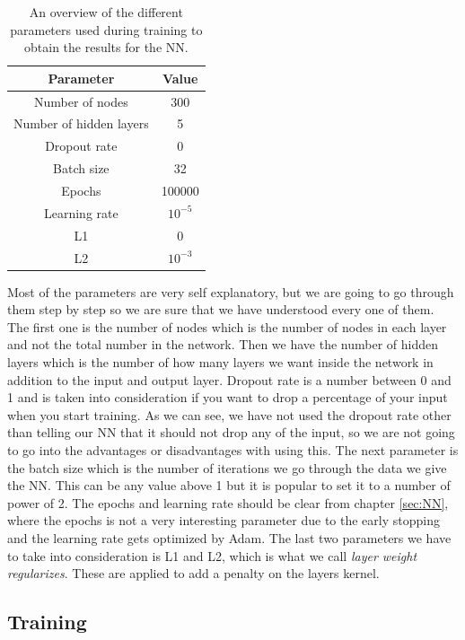 \begin{table}[H]
    \centering
    \renewcommand{\arraystretch}{1.}
    \begin{tabular}{c c}
    \toprule
        \textbf{Parameter} & \textbf{Value}\\
        \midrule
        \midrule
        Number of nodes & 300  \\
        Number of hidden layers & 5\\
        Dropout rate & 0\\
        Batch size & 32\\
        Epochs & 100000\\
        Learning rate & $10^{-5}$\\
        L1 & 0\\
        L2 & $10^{-3}$\\
        \bottomrule
    \end{tabular}
    \caption{An overview of the different parameters used during training to obtain the results for the NN.}
    \label{tab:parametersNN}
\end{table}

Most of the parameters are very self explanatory, but we are going to go through them step by step so we are sure that we have understood every one of them. The first one is the number of nodes which is the number of nodes in each layer and not the total number in the network. Then we have the number of hidden layers which is the number of how many layers we want inside the network in addition to the input and output layer. Dropout rate is a number between 0 and 1 and is taken into consideration if you want to drop a percentage of your input when you start training. As we can see, we have not used the dropout rate other than telling our NN that it should not drop any of the input, so we are not going to go into the advantages or disadvantages with using this. The next parameter is the batch size which is the number of iterations we go through the data we give the NN. This can be any value above 1 but it is popular to set it to a number of power of 2. The epochs and learning rate should be clear from chapter \ref{sec:NN}, where the epochs is not a very interesting parameter due to the early stopping and the learning rate gets optimized by Adam. The last two parameters we have to take into consideration is L1 and L2, which is what we call \textit{layer weight regularizes}. These are applied to add a penalty on the layers kernel. 

\subsection{Training}

